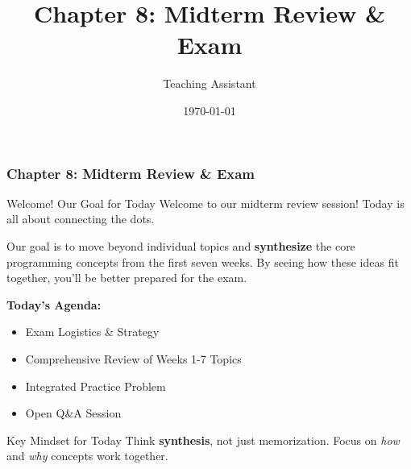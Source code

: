 \documentclass{beamer}
\title{Chapter 8: Midterm Review \& Exam}
\author{Teaching Assistant}
\institute{University Name}
\date{\today}
\begin{document}
\frame{\titlepage}

\begin{frame}[fragile]
    \frametitle{Chapter 8: Midterm Review \& Exam}
    
    \begin{block}{Welcome! Our Goal for Today}
        Welcome to our midterm review session! Today is all about connecting the dots.
        \vspace{0.5em}
        
        Our goal is to move beyond individual topics and \textbf{synthesize} the core programming concepts from the first seven weeks. By seeing how these ideas fit together, you'll be better prepared for the exam.
    \end{block}
    
    \vspace{1em}
    
    \textbf{Today's Agenda:}
    \begin{itemize}
        \item Exam Logistics \& Strategy
        \item Comprehensive Review of Weeks 1-7 Topics
        \item Integrated Practice Problem
        \item Open Q\&A Session
    \end{itemize}
    
    \vspace{\fill}
    
    \begin{alertblock}{Key Mindset for Today}
        Think \textbf{synthesis}, not just memorization. Focus on \textit{how} and \textit{why} concepts work together.
    \end{alertblock}
    
\end{frame}
\end{document}

